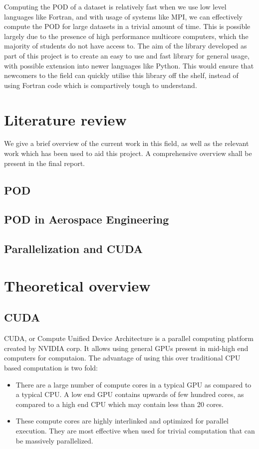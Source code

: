 \documentclass[]{aiaa-tc}%
\begin{document}
Computing the POD of a dataset is relatively fast when we use low level languages
like Fortran, and with usage of systems like MPI, we can effectively compute the
POD for large datasets in a trivial amount of time. This is possible largely due
to the presence of high performance multicore computers, which the majority of 
students do not have access to. The aim of the library developed as part of this
project is to create an easy to use and fast library for general usage, with 
possible extension into newer languages like Python. This would ensure that 
newcomers to the field can quickly utilise this library off the shelf, instead of
using Fortran code which is compartively tough to understand. 

\section{Literature review}
We give a brief overview of the current work in this field, as well as the 
relevant work which has been used to aid this project. A comprehensive overview 
shall be present in the final report.
\subsection{POD}
\subsection{POD in Aerospace Engineering}
\subsection{Parallelization and CUDA}

\section{Theoretical overview}
\subsection{CUDA}
CUDA, or Compute Unified Device Architecture is a parallel computing platform 
created by NVIDIA corp. It allows using general GPUs present in mid-high end 
computers for computaion. The advantage of using this over traditional CPU based
computation is two fold:

\begin{itemize}
\item 
	There are a large number of compute cores in a typical GPU as compared to 
	a typical CPU. A low end GPU contains upwards of few hundred cores, as 
	compared to a high end CPU which may contain less than 20 cores.
\item
	These compute cores are highly interlinked and optimized for parallel 
	execution. They are most effective when used for trivial computation 
	that can be massively parallelized.
\end{itemize}
\end{document}
